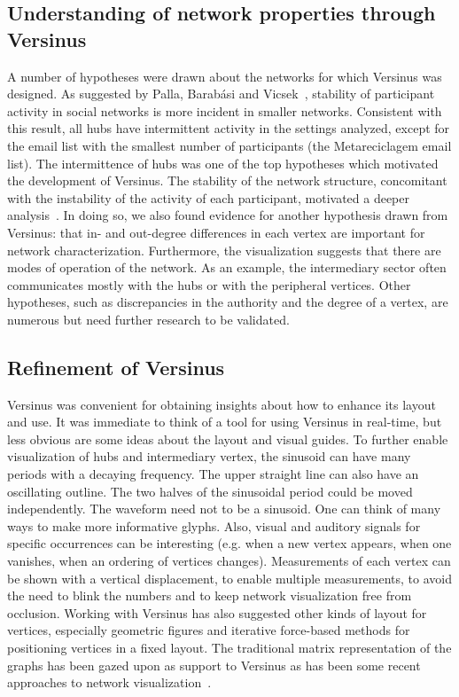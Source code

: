 \subsection{Understanding of network properties through Versinus}
A number of hypotheses were drawn about the networks for which Versinus was designed.
As suggested by Palla, Barab\'asi and Vicsek~\cite{barabasiEvo}, stability of participant activity in social networks is more incident in smaller networks.
Consistent with this result, all hubs have intermittent activity in the settings analyzed, except for the email list with the smallest number of participants (the Metareciclagem email list).
The intermittence of hubs was one of the top hypotheses which motivated the development of Versinus.
The stability of the network structure, concomitant with the instability of the activity of each participant,
motivated a deeper analysis~\cite{stab}.
In doing so, we also found evidence for another hypothesis drawn from Versinus:
that in- and out-degree differences in each vertex are important for network characterization.
Furthermore, the visualization suggests that there are modes of operation of the network.
As an example, the intermediary sector often communicates mostly with the hubs or with the peripheral vertices.
Other hypotheses,
such as discrepancies in the authority and the degree of a vertex,
are numerous but need further research to be validated.

\subsection{Refinement of Versinus}\label{sec:verref}
Versinus was convenient for obtaining insights about how to enhance its layout and use.
It was immediate to think of a tool for using Versinus
in real-time, but less obvious are some ideas about the layout and visual guides. 
To further enable visualization of hubs and intermediary vertex,
the sinusoid can have many periods 
with a decaying frequency.
The upper straight line can also have an oscillating outline.
The two halves of the sinusoidal period could be moved independently.
The waveform need not to be a sinusoid.
One can think of many ways to make more informative glyphs.
Also, visual and auditory signals for specific occurrences can be interesting
(e.g. when a new vertex appears, when one vanishes, when an ordering of vertices changes).
Measurements of each vertex can be shown with a vertical displacement,
to enable multiple measurements, to avoid the need to blink the numbers and to keep network visualization free from occlusion.
Working with Versinus has also suggested other kinds of layout for vertices, 
especially geometric figures and iterative force-based methods for positioning vertices in a fixed layout.
The traditional matrix representation of the graphs has been gazed upon as support to Versinus 
as has been some recent approaches to network visualization~\cite{Viz1}.


